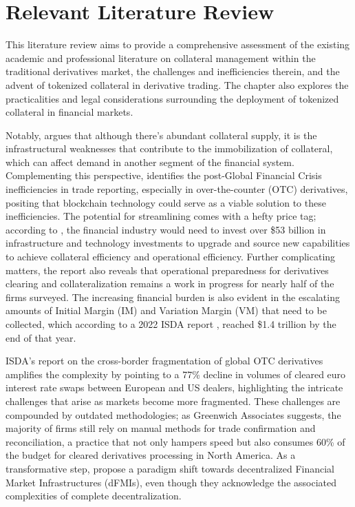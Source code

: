 \section{Relevant Literature Review}
\label{sec:lit_review}
This literature review aims to provide a comprehensive assessment of the existing academic and professional literature on collateral management within the traditional derivatives market, the challenges and inefficiencies therein, and the advent of tokenized collateral in derivative trading. The chapter also explores the practicalities and legal considerations surrounding the deployment of tokenized collateral in financial markets.

Notably, \citep{anderson2014economics} argues that although there's abundant collateral supply, it is the infrastructural weaknesses that contribute to the immobilization of collateral, which can affect demand in another segment of the financial system. Complementing this perspective, \citep{jayeola2020inefficiencies} identifies the post-Global Financial Crisis inefficiencies in trade reporting, especially in over-the-counter (OTC) derivatives, positing that blockchain technology could serve as a viable solution to these inefficiencies. The potential for streamlining comes with a hefty price tag; according to \citep{Celent}, the financial industry would need to invest over \$53 billion in infrastructure and technology investments to upgrade and source new capabilities to achieve collateral efficiency and operational efficiency. Further complicating matters, the report also reveals that operational preparedness for derivatives clearing and collateralization remains a work in progress for nearly half of the firms surveyed. The increasing financial burden is also evident in the escalating amounts of Initial Margin (IM) and Variation Margin (VM) that need to be collected, which according to a 2022 ISDA report \citep{isda_key_trends}, reached \$1.4 trillion by the end of that year.

ISDA’s report on the cross-border fragmentation of global OTC derivatives \citep{isda_fragmentation} amplifies the complexity by pointing to a 77\% decline in volumes of cleared euro interest rate swaps between European and US dealers, highlighting the intricate challenges that arise as markets become more fragmented. These challenges are compounded by outdated methodologies; as Greenwich Associates suggests, the majority of firms still rely on manual methods for trade confirmation and reconciliation, a practice that not only hampers speed but also consumes 60\% of the budget for cleared derivatives processing in North America. As a transformative step, \citep{feenan2021decentralized} propose a paradigm shift towards decentralized Financial Market Infrastructures (dFMIs), even though they acknowledge the associated complexities of complete decentralization.

